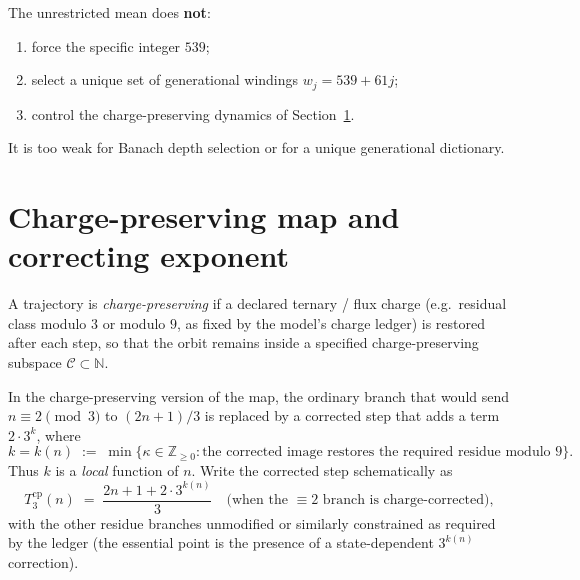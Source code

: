 \begin{corollary}
\label{cor:weak}
The unrestricted mean does \textbf{not}:
\begin{enumerate}[label=(\roman*)]
  \item force the specific integer \(539\);
  \item select a unique set of generational windings \(w_j=539+61j\);
  \item control the charge-preserving dynamics of Section~\ref{sec:charge}.
\end{enumerate}
It is too weak for Banach depth selection or for a unique generational
dictionary.
\end{corollary}

\section{Charge-preserving map and correcting exponent}
\label{sec:charge}

\begin{definition}
\label{def:charge-pres}
A trajectory is \emph{charge-preserving} if a declared ternary / flux charge
(e.g.\ residual class modulo \(3\) or modulo \(9\), as fixed by the model’s
charge ledger) is restored after each step, so that the orbit remains inside a
specified charge-preserving subspace \(\mathcal{C}\subset\mathbb{N}\).
\end{definition}

\begin{definition}
\label{def:k-min}
In the charge-preserving version of the map, the ordinary branch that would
send \(n\equiv 2\pmod{3}\) to \((2n+1)/3\) is replaced by a corrected step that
adds a term \(2\cdot 3^k\), where
\begin{equation}
\label{eq:k-min}
k=k(n)
\;:=\;
\min\bigl\{
\kappa\in\mathbb{Z}_{\ge 0}
:
\text{the corrected image restores the required residue modulo \(9\)}
\bigr\}.
\end{equation}
Thus \(k\) is a \emph{local} function of \(n\). Write the corrected step
schematically as
\begin{equation}
\label{eq:T3-corr}
T_3^{\mathrm{cp}}(n)
\;=\;
\frac{2n+1+2\cdot 3^{k(n)}}{3}
\quad\text{(when the \(\equiv 2\) branch is charge-corrected)},
\end{equation}
with the other residue branches unmodified or similarly constrained as
required by the ledger (the essential point is the presence of a
state-dependent \(3^{k(n)}\) correction).
\end{definition}

